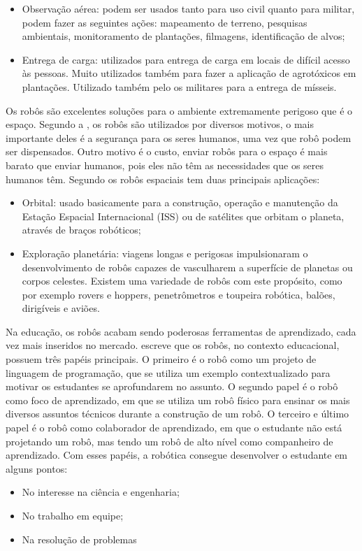 \begin{itemize}
	\item Observação aérea: podem ser usados tanto para uso civil quanto para militar, podem fazer as seguintes ações: mapeamento de terreno, pesquisas ambientais, monitoramento de plantações, filmagens, identificação de alvos;
	
	\item Entrega de carga: utilizados para entrega de carga em locais de difícil acesso às pessoas. Muito utilizados também para fazer a aplicação de agrotóxicos em plantações. Utilizado também pelo os militares para a entrega de mísseis. 
\end{itemize}

Os robôs são excelentes soluções para o ambiente extremamente perigoso que é o espaço. Segundo a \cite{nasa_2017}, os robôs são utilizados por diversos motivos, o mais importante deles é a segurança para os seres humanos, uma vez que robô podem ser dispensados. Outro motivo é o custo, enviar robôs para o espaço é mais barato que enviar humanos, pois eles não têm as necessidades que os seres humanos têm. Segundo \cite{esa_2014} os robôs espaciais tem duas principais aplicações: 

\begin{itemize}
	\item Orbital: usado basicamente para a construção, operação e manutenção da Estação Espacial Internacional (ISS) ou de satélites que orbitam o planeta, através de braços robóticos;
	
	\item Exploração planetária: viagens longas e perigosas impulsionaram o desenvolvimento de robôs capazes de vasculharem a superfície de planetas ou corpos celestes. Existem uma variedade de robôs com este propósito, como por exemplo rovers e hoppers, penetrômetros e toupeira robótica, balões, dirigíveis e aviões. 
\end{itemize}

Na educação, os robôs acabam sendo poderosas ferramentas de aprendizado, cada vez mais inseridos no mercado. \cite{siciliano2016} escreve que os robôs, no contexto educacional, possuem três papéis principais. O primeiro é o robô como um projeto de linguagem de programação, que se utiliza um exemplo contextualizado para motivar os estudantes se aprofundarem no assunto. O segundo papel é o robô como foco de aprendizado, em que se utiliza um robô físico para ensinar os mais diversos assuntos técnicos durante a construção de um robô. O terceiro e último papel é o robô como colaborador de aprendizado, em que o estudante não está projetando um robô, mas tendo um robô de alto nível como companheiro de aprendizado. Com esses papéis, a robótica consegue desenvolver o estudante em alguns pontos: 

\begin{itemize}
	\item No interesse na ciência e engenharia;
	
	\item No trabalho em equipe;
	
	\item Na resolução de problemas 
\end{itemize}



